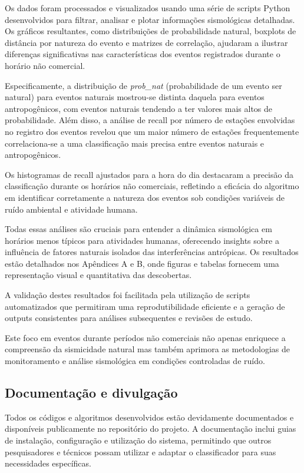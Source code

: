 \par{Os dados foram processados e visualizados usando uma série de scripts Python desenvolvidos para filtrar, analisar e plotar informações sismológicas detalhadas. Os gráficos resultantes, como distribuições de probabilidade natural, boxplots de distância por natureza do evento e matrizes de correlação, ajudaram a ilustrar diferenças significativas nas características dos eventos registrados durante o horário não comercial.}

\par{Especificamente, a distribuição de \textit{prob\_nat} (probabilidade de um evento ser natural) para eventos naturais mostrou-se distinta daquela para eventos antropogênicos, com eventos naturais tendendo a ter valores mais altos de probabilidade. Além disso, a análise de recall por número de estações envolvidas no registro dos eventos revelou que um maior número de estações frequentemente correlaciona-se a uma classificação mais precisa entre eventos naturais e antropogênicos.}

\par{Os histogramas de recall ajustados para a hora do dia destacaram a precisão da classificação durante os horários não comerciais, refletindo a eficácia do algoritmo em identificar corretamente a natureza dos eventos sob condições variáveis de ruído ambiental e atividade humana.}

\par{Todas essas análises são cruciais para entender a dinâmica sismológica em horários menos típicos para atividades humanas, oferecendo insights sobre a influência de fatores naturais isolados das interferências antrópicas. Os resultados estão detalhados nos Apêndices A e B, onde figuras e tabelas fornecem uma representação visual e quantitativa das descobertas.}

\par{A validação destes resultados foi facilitada pela utilização de scripts automatizados que permitiram uma reprodutibilidade eficiente e a geração de outputs consistentes para análises subsequentes e revisões de estudo.}

\par{Este foco em eventos durante períodos não comerciais não apenas enriquece a compreensão da sismicidade natural mas também aprimora as metodologias de monitoramento e análise sismológica em condições controladas de ruído.}



\subsection{Documentação e divulgação}
\label{subsec:documentacao}
\par{Todos os códigos e algoritmos desenvolvidos estão devidamente documentados e disponíveis publicamente no repositório do projeto. A documentação inclui guias de instalação, configuração e utilização do sistema, permitindo que outros pesquisadores e técnicos possam utilizar e adaptar o classificador para suas necessidades específicas.}


